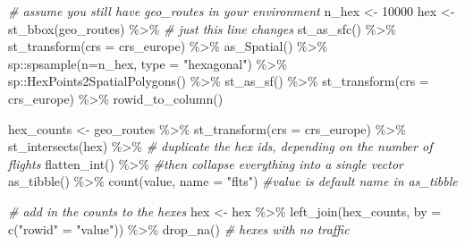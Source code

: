 \documentclass[
]{book}
\newenvironment{Shaded}{\begin{snugshade}}{\end{snugshade}}
\newcommand{\AttributeTok}[1]{\textcolor[rgb]{0.77,0.63,0.00}{#1}}
\newcommand{\CommentTok}[1]{\textcolor[rgb]{0.56,0.35,0.01}{\textit{#1}}}
\newcommand{\DecValTok}[1]{\textcolor[rgb]{0.00,0.00,0.81}{#1}}
\newcommand{\FunctionTok}[1]{\textcolor[rgb]{0.00,0.00,0.00}{#1}}
\newcommand{\NormalTok}[1]{#1}
\newcommand{\OtherTok}[1]{\textcolor[rgb]{0.56,0.35,0.01}{#1}}
\newcommand{\SpecialCharTok}[1]{\textcolor[rgb]{0.00,0.00,0.00}{#1}}
\newcommand{\StringTok}[1]{\textcolor[rgb]{0.31,0.60,0.02}{#1}}
\begin{document}
\begin{Shaded}
\begin{Highlighting}[]
\CommentTok{\# assume you still have geo\_routes in your environment}
\NormalTok{n\_hex }\OtherTok{\textless{}{-}} \DecValTok{10000}
\NormalTok{hex }\OtherTok{\textless{}{-}} \FunctionTok{st\_bbox}\NormalTok{(geo\_routes) }\SpecialCharTok{\%\textgreater{}\%} \CommentTok{\# just this line changes}
  \FunctionTok{st\_as\_sfc}\NormalTok{() }\SpecialCharTok{\%\textgreater{}\%} 
  \FunctionTok{st\_transform}\NormalTok{(}\AttributeTok{crs =}\NormalTok{ crs\_europe) }\SpecialCharTok{\%\textgreater{}\%} 
  \FunctionTok{as\_Spatial}\NormalTok{() }\SpecialCharTok{\%\textgreater{}\%} 
\NormalTok{  sp}\SpecialCharTok{::}\FunctionTok{spsample}\NormalTok{(}\AttributeTok{n=}\NormalTok{n\_hex, }\AttributeTok{type =} \StringTok{"hexagonal"}\NormalTok{) }\SpecialCharTok{\%\textgreater{}\%} 
\NormalTok{  sp}\SpecialCharTok{::}\FunctionTok{HexPoints2SpatialPolygons}\NormalTok{() }\SpecialCharTok{\%\textgreater{}\%} 
  \FunctionTok{st\_as\_sf}\NormalTok{() }\SpecialCharTok{\%\textgreater{}\%} 
  \FunctionTok{st\_transform}\NormalTok{(}\AttributeTok{crs =}\NormalTok{ crs\_europe) }\SpecialCharTok{\%\textgreater{}\%} 
  \FunctionTok{rowid\_to\_column}\NormalTok{() }

\NormalTok{hex\_counts }\OtherTok{\textless{}{-}}\NormalTok{ geo\_routes }\SpecialCharTok{\%\textgreater{}\%}
  \FunctionTok{st\_transform}\NormalTok{(}\AttributeTok{crs =}\NormalTok{ crs\_europe) }\SpecialCharTok{\%\textgreater{}\%} 
  \FunctionTok{st\_intersects}\NormalTok{(hex) }\SpecialCharTok{\%\textgreater{}\%}
  \CommentTok{\# duplicate the hex ids, depending on the number of flights}
  \FunctionTok{flatten\_int}\NormalTok{() }\SpecialCharTok{\%\textgreater{}\%} \CommentTok{\#then collapse everything into a single vector}
  \FunctionTok{as\_tibble}\NormalTok{() }\SpecialCharTok{\%\textgreater{}\%} 
  \FunctionTok{count}\NormalTok{(value, }\AttributeTok{name =} \StringTok{"flts"}\NormalTok{) }\CommentTok{\#value is default name in as\_tibble}

\CommentTok{\# add in the counts to the hexes}
\NormalTok{hex }\OtherTok{\textless{}{-}}\NormalTok{ hex }\SpecialCharTok{\%\textgreater{}\%}  
  \FunctionTok{left\_join}\NormalTok{(hex\_counts, }\AttributeTok{by =} \FunctionTok{c}\NormalTok{(}\StringTok{"rowid"} \OtherTok{=} \StringTok{"value"}\NormalTok{)) }\SpecialCharTok{\%\textgreater{}\%} 
  \FunctionTok{drop\_na}\NormalTok{() }\CommentTok{\# hexes with no traffic}


\end{Highlighting}
\end{Shaded}
\end{document}
